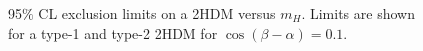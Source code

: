 \begin{figure}[htb]
\centering
{}

\caption{95$\%$ CL exclusion limits on a 2HDM versus $m_{H}$. Limits are shown for a type-1 and type-2 2HDM for $\cos(\beta-\alpha)=0.1$.}
    \label{fig:2HDM2}
\end{figure}



